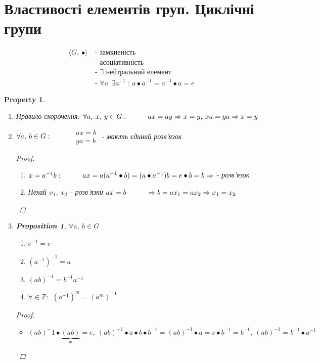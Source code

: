 \documentclass[a4paper,12pt, centered]{bookest}
\newtheorem*{property*}{Property}
\newtheorem*{prop*}{Proposition}
\newcommand\tab[1][1cm]{\hspace*{#1}}
\begin{document}
\section{Властивості елементів груп. Циклічні групи}
\begin{align*}
	\langle G,\>\bullet\rangle\> & \textrm{- замкненість}\\
	& \textrm{- асоціативність} \\
	& \textrm{- }\exists\textrm{ нейтральний елемент}\\
	& \textrm{- } \forall a\>\>\exists a^{-1}\>:\>a\bullet a^{-1}=a^{-1}\bullet a=e
\end{align*}
\begin{property*}$ $
	\begin{enumerate}
		\item Правило скорочення: $\\\forall a,\>x,\>y\in G:\tab ax=ay\Rightarrow x=y,\>xa=ya\Rightarrow x=y$
		\item $\forall a,\>b\in G:\tab$ $\begin{array}{c}
			ax=b\\ya=b
		\end{array}$ - мають єдиний розв'язок \begin{proof}$ $
			\begin{enumerate}\item $x=a^{-1}b:\tab ax=a(a^{-1}\bullet b)=(a\bullet a^{-1})b=e\bullet b=b\Rightarrow$ - розв'язок
			\item Нехай $x_1,\>x_2$ - розв'язки $ax=b\tab \Rightarrow b=ax_1=ax_2\Rightarrow x_1=x_2$
			  \end{enumerate}
		\end{proof}
		\item \begin{prop*}$\forall a,\>b\in G$
			\begin{enumerate} 
				\item $e^{-1}=e$
				\item $(a^{-1})^{-1}=a$
				\item $(ab)^{-1}=b^{-1}a^{-1}$
				\item $\forall\in\mathbb{Z}:\>\>(a^{-1})^m=(a^m)^{-1}$
			\end{enumerate}
			\begin{proof}$ $
				\begin{itemize}
					\item [(c)] $(ab)^-1\bullet\underbrace{(ab)}_{x}=e,\>(ab)^{-1}\bullet a\bullet b\bullet b^{-1}=(ab)^{-1}\bullet a=e\bullet b^{-1}=b^{-1},\>(ab)^{-1}=b^{-1}\bullet a^{-1}$

\end{itemize}
\end{proof}
\end{prop*}
\end{enumerate}
\end{property*}
\end{document}
